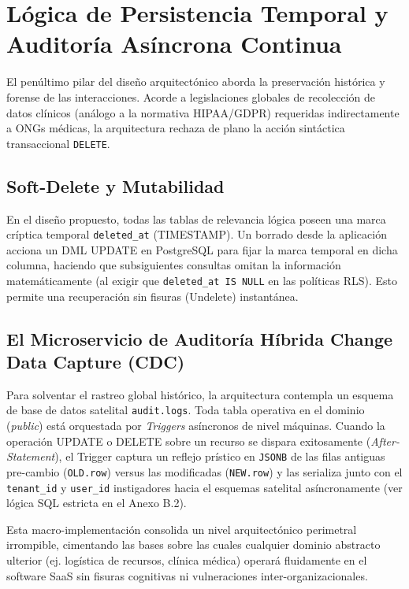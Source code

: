 \documentclass[11pt,a4paper,oneside]{report}
\begin{document}
\section{L\'ogica de Persistencia Temporal y Auditor\'ia As\'incrona Continua}
El pen\'ultimo pilar del dise\~no arquitect\'onico aborda la preservaci\'on hist\'orica y forense de las interacciones. Acorde a legislaciones globales de recolecci\'on de datos cl\'inicos (an\'alogo a la normativa HIPAA/GDPR) requeridas indirectamente a ONGs m\'edicas, la arquitectura rechaza de plano la acci\'on sint\'actica transaccional \texttt{DELETE}. 

\subsection{Soft-Delete y Mutabilidad}
En el dise\~no propuesto, todas las tablas de relevancia l\'ogica poseen una marca cr\'iptica temporal \texttt{deleted\_at} (TIMESTAMP). Un borrado desde la aplicaci\'on acciona un DML UPDATE en PostgreSQL para fijar la marca temporal en dicha columna, haciendo que subsiguientes consultas omitan la informaci\'on matem\'aticamente (al exigir que \texttt{deleted\_at IS NULL} en las pol\'iticas RLS). Esto permite una recuperaci\'on sin fisuras (Undelete) instant\'anea.

\subsection{El Microservicio de Auditor\'ia H\'ibrida Change Data Capture (CDC)}
Para solventar el rastreo global hist\'orico, la arquitectura contempla un esquema de base de datos satelital \texttt{audit.logs}. Toda tabla operativa en el dominio (\textit{public}) est\'a orquestada por \textit{Triggers} as\'incronos de nivel m\'aquinas. Cuando la operaci\'on UPDATE o DELETE sobre un recurso se dispara exitosamente (\textit{After-Statement}), el Trigger captura un reflejo pr\'istico en \texttt{JSONB} de las filas antiguas pre-cambio (\texttt{OLD.row}) versus las modificadas (\texttt{NEW.row}) y las serializa junto con el \texttt{tenant\_id} y \texttt{user\_id} instigadores hacia el esquemas satelital as\'incronamente (ver l\'ogica SQL estricta en el Anexo B.2).

Esta macro-implementaci\'on consolida un nivel arquitect\'onico perimetral irrompible, cimentando las bases sobre las cuales cualquier dominio abstracto ulterior (ej. log\'istica de recursos, cl\'inica m\'edica) operar\'a fluidamente en el software SaaS sin fisuras cognitivas ni vulneraciones inter-organizacionales.
\end{document}
